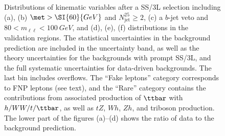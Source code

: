 \begin{figure}[p!]
\begin{subfigure}[t]{0.46\textwidth}
\caption{}\label{fig:VRf}\end{subfigure}
\caption{Distributions of kinematic variables after a SS/3L selection 
including (a), (b) $\met>\SI{60}{GeV}$ and $N_\text{jet}^{25}\ge 2$, 
(c) a $b$-jet veto and $80<m_{\ell\ell}<\SI{100}{GeV}$, 
and (d), (e), (f) distributions in the validation regions. 
The statistical uncertainties in the background prediction are included in the uncertainty band, 
as well as the theory uncertainties for the backgrounds with prompt SS/3L, 
and the full systematic uncertainties for data-driven backgrounds. 
The last bin includes overflows. 
The ``Fake leptons'' category corresponds to FNP leptons (see text), 
and the ``Rare'' category contains the contributions from associated production of $\ttbar$ with $h/WW/t/\ttbar$, 
as well as $tZ$, $Wh$, $Zh$, and triboson production. 
The lower part of the figures (a)--(d) shows the ratio of data to the background prediction.}
\label{fig:Validation_plots} 
\end{figure} 
